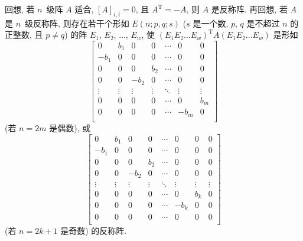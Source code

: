 \documentclass[../libro.tex]{subfiles}
\begin{document}
回想, 若 \(n\)~级阵 \(A\) 适合,
\([A]_{i,i} = 0\),
且 \(A^{\mathrm{T}} = -A\),
则 \(A\) 是反称阵.
再回想, 若 \(A\) 是 \(n\)~级反称阵,
则存在若干个形如 \(E(n; p, q; s)\)
(\(s\) 是一个数, %
\(p\), \(q\) 是不超过 \(n\) 的正整数,
且 \(p \neq q\)) %
的阵
\(E_1\), \(E_2\), \(\dots\), \(E_w\),
使 \((E_1 E_2 \dots E_w)^{\mathrm{T}}
A (E_1 E_2 \dots E_w)\)
是形如
\begin{equation*}
    \begin{bmatrix}
        0      & b_1    & 0      & 0      & \cdots & 0      & 0      \\
        -b_1   & 0      & 0      & 0      & \cdots & 0      & 0      \\
        0      & 0      & 0      & b_2    & \cdots & 0      & 0      \\
        0      & 0      & -b_2   & 0      & \cdots & 0      & 0      \\
        \vdots & \vdots & \vdots & \vdots & \ddots & \vdots & \vdots \\
        0      & 0      & 0      & 0      & \cdots & 0      & b_m    \\
        0      & 0      & 0      & 0      & \cdots & -b_m   & 0      \\
    \end{bmatrix}
\end{equation*}
(若 \(n = 2m\) 是偶数), 或
\begin{equation*}
    \begin{bmatrix}
        0      & b_1    & 0      & 0      & \cdots & 0      & 0      & 0      \\
        -b_1   & 0      & 0      & 0      & \cdots & 0      & 0      & 0      \\
        0      & 0      & 0      & b_2    & \cdots & 0      & 0      & 0      \\
        0      & 0      & -b_2   & 0      & \cdots & 0      & 0      & 0      \\
        \vdots & \vdots & \vdots & \vdots & \ddots & \vdots & \vdots & \vdots \\
        0      & 0      & 0      & 0      & \cdots & 0      & b_k    & 0      \\
        0      & 0      & 0      & 0      & \cdots & -b_k   & 0      & 0      \\
        0      & 0      & 0      & 0      & \cdots & 0      & 0      & 0      \\
    \end{bmatrix}
\end{equation*}
(若 \(n = 2k + 1\) 是奇数) 的反称阵.
\end{document}
